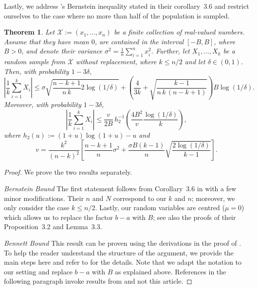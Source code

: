 \documentclass[aos]{imsart2}
\theoremstyle{plain}
\newtheorem{theorem}{Theorem}[section]
\theoremstyle{definition}
\begin{document}
\begin{appendix}
Lastly, we address \cite{bardenet_concentration_2015}'s Bernstein inequality stated in their corollary~3.6 and restrict ourselves to the case where no more than half of the population is sampled.
\begin{theorem}\label{thm:bm}
    Let $\mathcal{X}:=(x_1,\ldots,x_n)$ be a finite collection of real-valued numbers. Assume that they have mean $0$, are contained in the interval $[-B,B]$, where $B>0$, and denote their variance $\sigma^2 = \frac{1}{n} \sum_{i=1}^n x_i^2$. Further, let $X_1,\ldots,X_k$ be a random sample from $\mathcal{X}$ without replacement, where $k\leq n/2$ and let $\delta \in (0,1)$. Then, with probability $1-3\delta$,
    \begin{equation*}
        \left\vert\frac{1}{k}\sum_{i=1}^k X_i\right\vert \leq \sigma \sqrt{\frac{n-k+1}{n\,k}2\log(1/\delta)}+\left(\frac{4}{3k} + \sqrt{\frac{k-1}{n\,k\,(n-k+1)}}\right) B\log(1/\delta).
    \end{equation*}
    Moreover, with probability $1-3\delta$,
    \begin{equation*}
        \left\vert\frac{1}{k}\sum_{i=1}^k X_i\right\vert \leq \frac{v}{2B}\, h^{-1}_2\!\!\left(\frac{4B^2}{v}\frac{\log(1/\delta)}{k}\right),
    \end{equation*}
    where $h_2(u):=(1+u)\log(1+u)-u$ and
    \begin{equation*}
        v = \frac{k^2}{(n-k)^2}\left[\frac{n-k+1}{n}\sigma^2+\frac{\sigma B(k-1)}{n}\sqrt{\frac{2\log(1/\delta)}{k-1}}\right].
    \end{equation*}
\end{theorem}

\begin{proof}
    We prove the two results separately.
    
    \textit{Bernstein Bound} The first statement follows from Corollary~3.6 in \cite{bardenet_concentration_2015} with a few minor modifications. Their $n$ and $N$ correspond to our $k$ and $n$; moreover, we only consider the case $k\leq n/2$. Lastly, our random variables are centred ($\mu=0$) which allows us to replace the factor $b-a$ with $B$; see also the proofs of their Proposition~3.2 and Lemma~3.3.

    \textit{Bennett Bound} This result can be proven using the derivations in the proof of \cite[Thm.~3.5]{bardenet_concentration_2015}. To help the reader understand the structure of the argument, we provide the main steps here and refer to \cite{bardenet_concentration_2015} for the details. Note that we adapt the notation to our setting and replace $b-a$ with $B$ as explained above. References in the following paragraph invoke results from \cite{bardenet_concentration_2015} and not this article.


\end{proof}
\end{appendix}
\end{document}
